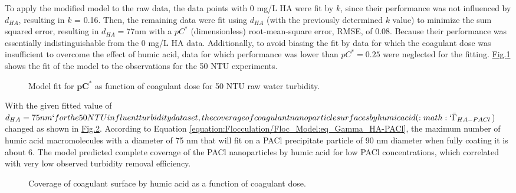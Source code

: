 \documentclass[letterpaper,10pt,english]{sphinxmanual}
\let\sphinxpxdimen\pdfpxdimen\else\newdimen\sphinxpxdimen
\begin{document}
To apply the modified model to the raw data, the data points with 0 mg/L HA were fit by \(k\), since their performance was not influenced by \(d_{HA}\), resulting in \(k\) = 0.16. Then, the remaining data were fit using \(d_{HA}\) (with the previously determined \(k\) value) to minimize the sum squared error, resulting in \(d_{HA}=77 \mathrm{nm}\) with a \(pC^*\) (dimensionless) root-mean-square error, RMSE, of 0.08. Because their performance was essentially indistinguishable from the 0 mg/L HA data. Additionally, to avoid biasing the fit by data for which the coagulant dose was insufficient to overcome the effect of humic acid, data for which performance was lower than \(pC^*=0.25\) were neglected for the fitting. \hyperref[\detokenize{Flocculation/Floc_Model:figure-du-fig4}]{Fig.\@ \ref{\detokenize{Flocculation/Floc_Model:figure-du-fig4}}} shows the fit of the model to the observations for the 50 NTU experiments.

\begin{figure}[htbp]
\centering
\capstart

\noindent\sphinxincludegraphics[width=400\sphinxpxdimen]{{Du_Fig4}.png}
\caption{Model fit for \(\boldsymbol{p}{\boldsymbol{C}}^{\boldsymbol{*}}\) as function of coagulant dose for 50 NTU raw water turbidity.}\label{\detokenize{Flocculation/Floc_Model:id46}}\label{\detokenize{Flocculation/Floc_Model:figure-du-fig4}}\end{figure}

With the given fitted value of \(d_{HA}=75 nm`for the 50 NTU influent turbidity data set, the coverage of coagulant nanoparticle surfaces by humic acid (:math:`{\bar{\Gamma}}_{HA-PACl}\)) changed as shown in \hyperref[\detokenize{Flocculation/Floc_Model:figure-du-fig5}]{Fig.\@ \ref{\detokenize{Flocculation/Floc_Model:figure-du-fig5}}}. According to Equation \eqref{equation:Flocculation/Floc_Model:eq_Gamma_HA-PACl}, the maximum number of humic acid macromolecules with a diameter of 75 nm that will fit on a PACl precipitate particle of 90 nm diameter when fully coating it is about 6. The model predicted complete coverage of the PACl nanoparticles by humic acid for low PACl concentrations, which correlated with very low observed turbidity removal efficiency.

\begin{figure}[htbp]
\centering
\capstart

\noindent\sphinxincludegraphics[width=400\sphinxpxdimen]{{Du_Fig5}.png}
\caption{Coverage of coagulant surface by humic acid as a function of coagulant dose.}\label{\detokenize{Flocculation/Floc_Model:id47}}\label{\detokenize{Flocculation/Floc_Model:figure-du-fig5}}\end{figure}
\end{document}
